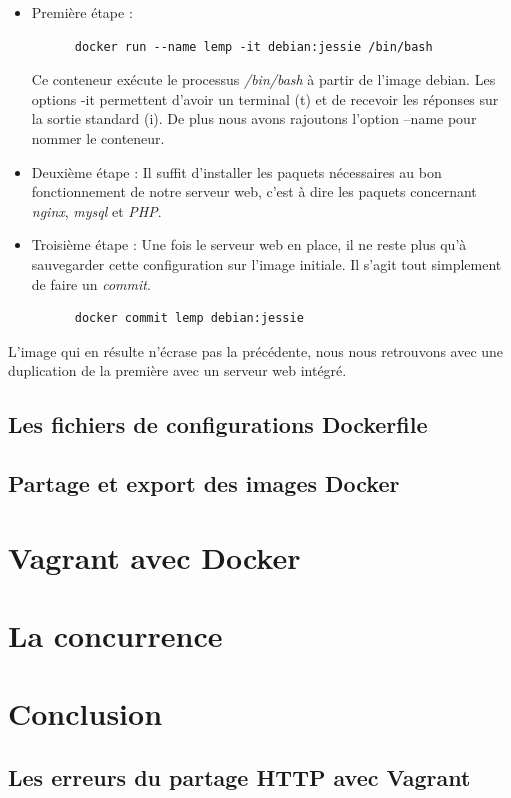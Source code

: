 \documentclass[12pt,a4paper]{article}
\begin{document}
\begin{itemize}
  \item{Première étape :}
    \begin{lstlisting}
      docker run --name lemp -it debian:jessie /bin/bash
    \end{lstlisting}
    Ce conteneur exécute le processus \textit{/bin/bash} à partir de l'image debian. Les options -it permettent d'avoir un terminal (t) et de recevoir les réponses sur la sortie standard (i). De plus nous avons rajoutons l'option --name pour nommer le conteneur.

  \item{Deuxième étape :}
    Il suffit d'installer les paquets nécessaires au bon fonctionnement de notre serveur web, c'est à dire les paquets concernant \textit{nginx}, \textit{mysql} et \textit{PHP}.

  \item{Troisième étape :}
    Une fois le serveur web en place, il ne reste plus qu'à sauvegarder cette configuration sur l'image initiale. Il s'agit tout simplement de faire un \textit{commit}.
    \begin{lstlisting}
      docker commit lemp debian:jessie
    \end{lstlisting}
\end{itemize}

L'image qui en résulte n'écrase pas la précédente, nous nous retrouvons avec une duplication de la première avec un serveur web intégré.

\subsection{Les fichiers de configurations Dockerfile}

\subsection{Partage et export des images Docker}

\section{Vagrant avec Docker}

\section{La concurrence}

\section{Conclusion}

\begin{appendix}
\section{Les erreurs du partage HTTP avec Vagrant}

\end{appendix}
\end{document}
